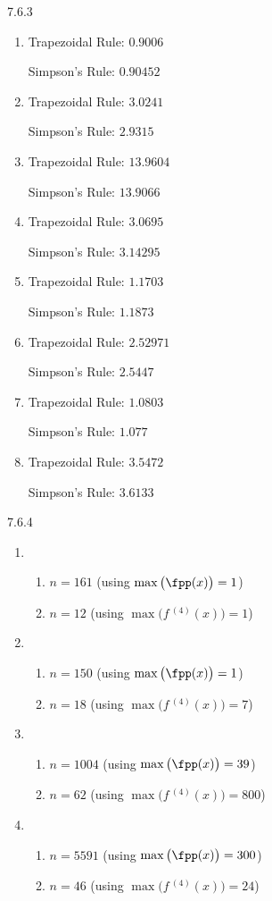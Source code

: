 \begin{Answer}{7.6.3}
\begin{enumerate}
\item {Trapezoidal Rule: 	$0.9006$

Simpson's Rule: $0.90452$
}
\item {Trapezoidal Rule: 	$3.0241$

Simpson's Rule: $2.9315$
}
\item {Trapezoidal Rule: 	$13.9604$

Simpson's Rule: $13.9066$
}
\item {Trapezoidal Rule: 	$3.0695$

Simpson's Rule: $3.14295$
}
\item
{Trapezoidal Rule: 	$1.1703$

Simpson's Rule: $1.1873$
}
\item {Trapezoidal Rule: 	$2.52971$

Simpson's Rule: $2.5447$
}
\item {Trapezoidal Rule: 	$1.0803$

Simpson's Rule: $1.077$
}
\item {Trapezoidal Rule: 	$3.5472$

Simpson's Rule: $3.6133$
}
\end{enumerate}
\end{Answer}
\begin{Answer}{7.6.4}
\begin{enumerate}
\item {\begin{enumerate}
\item		$n=161$ (using $\max\big(\fpp(x)\big)=1$)
\item		$n=12$	(using $\max\big(f\,^{(4)}(x)\big)=1$)
\end{enumerate}
}
\item {\begin{enumerate}
\item		$n=150$ (using $\max\big(\fpp(x)\big)=1$)
\item		$n=18$	(using $\max\big(f\,^{(4)}(x)\big)=7$)
\end{enumerate}
}
\item {\begin{enumerate}
\item		$n=1004$ (using $\max\big(\fpp(x)\big)=39$)
\item		$n=62$	(using $\max\big(f\,^{(4)}(x)\big)=800$)
\end{enumerate}
}
\item {\begin{enumerate}
\item		$n=5591$ (using $\max\big(\fpp(x)\big)=300$)
\item		$n=46$	(using $\max\big(f\,^{(4)}(x)\big)=24$)
\end{enumerate}
}
\end{enumerate}
\end{Answer}
